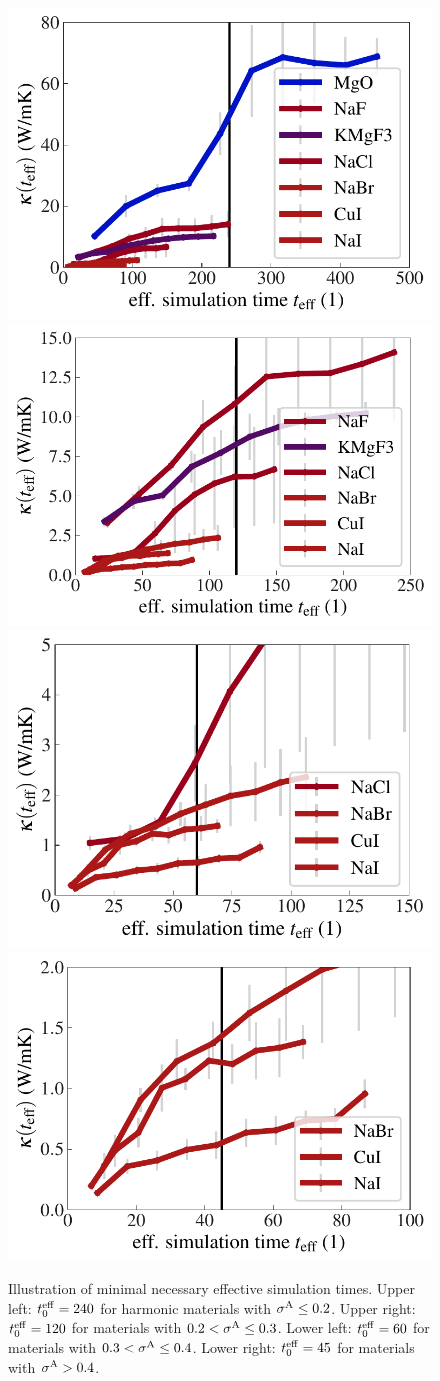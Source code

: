 %
\begin{figure}
	\includegraphics[width=.49\textwidth]{./data/plots/kappa_convergence/3.pdf}
	\includegraphics[width=.49\textwidth]{./data/plots/kappa_convergence/4.pdf}
	\includegraphics[width=.49\textwidth]{./data/plots/kappa_convergence/5.pdf}
	\includegraphics[width=.49\textwidth]{./data/plots/kappa_convergence/6.pdf}
	\caption{Illustration of minimal necessary effective simulation times. Upper left: $t^{\rm eff}_0 = 240$ for harmonic materials with $\sigma^\mathrm{A} \leq 0.2$. Upper right: $t^{\rm eff}_0 = 120$ for materials with $0.2 < \sigma^\mathrm{A} \leq 0.3$. Lower left: $t^{\rm eff}_0 = 60$ for materials with $0.3 < \sigma^\mathrm{A} \leq 0.4$. Lower right: $t^{\rm eff}_0 = 45$ for materials with $\sigma^\mathrm{A} > 0.4$.}
	\label{fig:results.convergence}
\end{figure}
